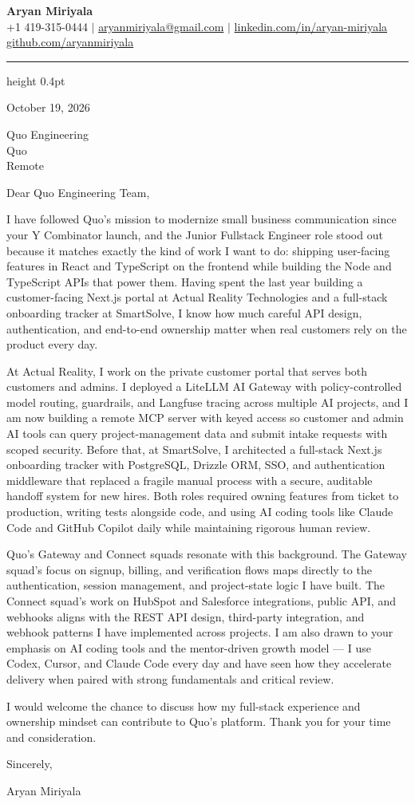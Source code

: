 \documentclass[letterpaper,11pt]{article}
\begin{document}
{\Large \textbf{Aryan Miriyala}}\\
\small
+1 419-315-0444 $|$ \href{mailto:aryanmiriyala@gmail.com}{aryanmiriyala@gmail.com} $|$ \href{https://www.linkedin.com/in/aryan-miriyala-7788a21b6/}{linkedin.com/in/aryan-miriyala}\\
\href{https://github.com/aryanmiriyala}{github.com/aryanmiriyala}

\vspace{2pt}
\hrule height 0.4pt
\vspace{10pt}

October 19, 2026

Quo Engineering\\
Quo\\
Remote

\vspace{2pt}

Dear Quo Engineering Team,

I have followed Quo's mission to modernize small business communication since your Y Combinator launch, and the Junior Fullstack Engineer role stood out because it matches exactly the kind of work I want to do: shipping user-facing features in React and TypeScript on the frontend while building the Node and TypeScript APIs that power them. Having spent the last year building a customer-facing Next.js portal at Actual Reality Technologies and a full-stack onboarding tracker at SmartSolve, I know how much careful API design, authentication, and end-to-end ownership matter when real customers rely on the product every day.

At Actual Reality, I work on the private customer portal that serves both customers and admins. I deployed a LiteLLM AI Gateway with policy-controlled model routing, guardrails, and Langfuse tracing across multiple AI projects, and I am now building a remote MCP server with keyed access so customer and admin AI tools can query project-management data and submit intake requests with scoped security. Before that, at SmartSolve, I architected a full-stack Next.js onboarding tracker with PostgreSQL, Drizzle ORM, SSO, and authentication middleware that replaced a fragile manual process with a secure, auditable handoff system for new hires. Both roles required owning features from ticket to production, writing tests alongside code, and using AI coding tools like Claude Code and GitHub Copilot daily while maintaining rigorous human review.

Quo's Gateway and Connect squads resonate with this background. The Gateway squad's focus on signup, billing, and verification flows maps directly to the authentication, session management, and project-state logic I have built. The Connect squad's work on HubSpot and Salesforce integrations, public API, and webhooks aligns with the REST API design, third-party integration, and webhook patterns I have implemented across projects. I am also drawn to your emphasis on AI coding tools and the mentor-driven growth model — I use Codex, Cursor, and Claude Code every day and have seen how they accelerate delivery when paired with strong fundamentals and critical review.

I would welcome the chance to discuss how my full-stack experience and ownership mindset can contribute to Quo's platform. Thank you for your time and consideration.

\vspace{8pt}
Sincerely,

\vspace{6pt}
Aryan Miriyala
\end{document}
